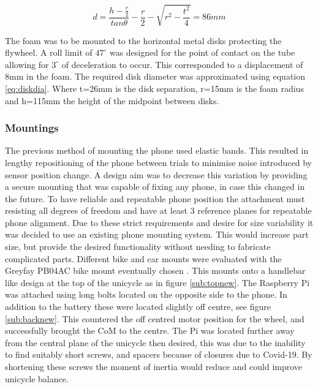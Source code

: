 \documentclass[twoside,twocolumn,12pt]{article}
\begin{document}
\begin{equation}
d =\frac{h-\frac{r}{2}}{tan\theta} - \frac{r}{2} - \sqrt{r^2-\frac{t^2}{4}} = 86mm
\label{eq:diskdia}
\end{equation}

The foam was to be mounted to the horizontal metal disks protecting the flywheel. A roll limit of $47^{\circ}$ was designed for the point of contact on the tube allowing for $3^{\circ}$ of deceleration to occur. This corresponded to a displacement of 8mm in the foam. The required disk diameter was approximated using equation \ref{eq:diskdia}. Where t=26mm is the disk separation, r=15mm is the foam radius and h=115mm the height of the midpoint between disks.

\subsubsection{Mountings}
The previous method of mounting the phone used elastic bands. This resulted in lengthy repositioning of the phone between trials to minimise noise introduced by sensor position change. A design aim was to decrease this variation by providing a secure mounting that was capable of fixing any phone, in case this changed in the future. 
\newline
To have reliable and repeatable phone position the attachment must resisting all degrees of freedom and have at least 3 reference planes for repeatable phone alignment. Due to these strict requirements and desire for size variability it was decided to use an existing phone mounting system. This would increase part size, but provide the desired functionality without needing to fabricate complicated parts. Different bike and car mounts were evaluated with the Greyfay PB04AC bike mount eventually chosen \cite{bike}. This mounts onto a handlebar like design at the top of the unicycle as in figure \ref{sub:topnew}. 
\newline
The Raspberry Pi was attached using long bolts located on the opposite side to the phone. In addition to the battery these were located slightly off centre, see figure \ref{sub:backnew}. This countered the off centred motor position for the wheel, and successfully brought the CoM to the centre. The Pi was located further away from the central plane of the unicycle then desired, this was due to the inability to find suitably short screws, and spacers because of closures due to Covid-19. By shortening these screws the moment of inertia would reduce and could improve unicycle balance.  
\end{document}
